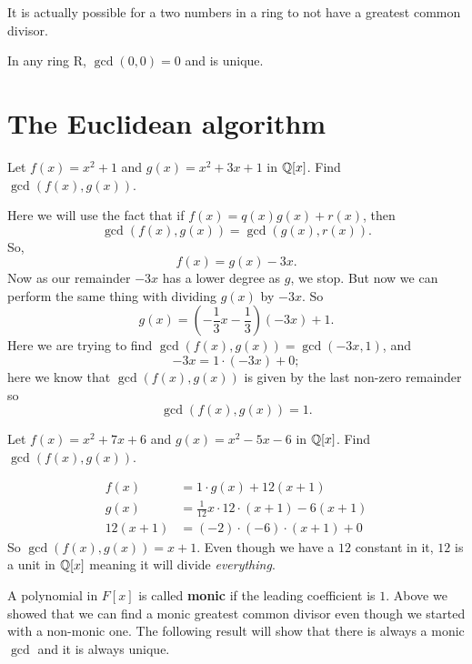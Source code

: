 \begin{remark}
    It is actually possible for a two numbers in a ring to not have a greatest common divisor.
\end{remark}

\begin{remark}
    In any ring R, $\gcd(0,0)=0$ and is unique.
\end{remark}

\section{The Euclidean algorithm}

\begin{example}
    Let $f(x) = x^2 + 1$ and $g(x) = x^2 + 3x +1$ in $\mathbb{Q}[x]$. Find $\gcd{(f(x), g(x))}$.
\end{example}

\begin{solution}
    Here we will use the fact that if $f(x) = q(x)g(x) + r(x)$, then
    \[ \gcd(f(x), g(x)) = \gcd(g(x), r(x)). \]
    So,
    \[ f(x) = g(x) - 3x. \]
    Now as our remainder $-3x$ has a lower degree as $g$, we stop. But now we can perform the same thing with dividing $g(x)$ by $-3x$. So
    \[ g(x) = \left(-\frac13 x - \frac13\right)(-3x) + 1. \]
    Here we are trying to find $\gcd(f(x), g(x)) = \gcd{(-3x, 1)}$, and
    \[ -3x = 1 \cdot (-3x) + 0; \]
    here we know that $\gcd{(f(x), g(x))}$ is given by the last non-zero remainder so
    \[ \gcd(f(x),g(x)) = 1. \]
\end{solution}

\begin{example}
    Let $f(x) = x^2 + 7x + 6$ and $g(x) = x^2 - 5x - 6$ in $\mathbb{Q}[x]$. Find $\gcd{(f(x), g(x))}$.
\end{example}

\begin{solution}
    \begin{align*}
        f(x) &= 1 \cdot g(x) + 12 (x + 1) \\
        g(x) &= \frac{1}{12} x \cdot 12 \cdot (x + 1) - 6(x+1) \\
        12(x + 1) &= (-2) \cdot (-6) \cdot (x + 1) + 0
    \end{align*}
    So $\gcd(f(x),g(x)) = x + 1$. Even though we have a $12$ constant in it, $12$ is a unit in $\mathbb{Q}[x]$ meaning it will divide \emph{everything}.
\end{solution}

\begin{remark}
    A polynomial in $F[x]$ is called \textbf{monic} if the leading coefficient is $1$. Above we showed that we can find a monic greatest common divisor even though we started with a non-monic one. The following result will show that there is always a monic $\gcd$ and it is always unique.
\end{remark}

